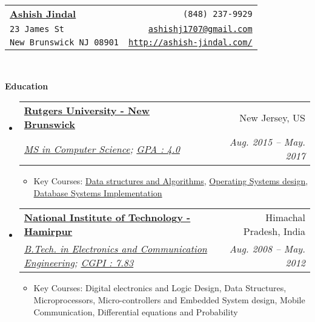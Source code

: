 \documentclass[letterpaper,11pt]{article}
\makeatletter
\newcommand{\resitem}[1]{\item #1 \vspace{-2pt}}
\newcommand{\resheading}[1]{{\large \colorbox{mygrey}{\begin{minipage}{\textwidth}{\textbf{#1 \vphantom{p\^{E}}}}\end{minipage}}}}
\newcommand{\ressubheading}[4]{
\begin{tabular*}{6.5in}{l@{\extracolsep{\fill}}r}
		\textbf{#1} & #2 \\
		\textit{#3} & \textit{#4} \\
\end{tabular*}\vspace{-6pt}}
\makeatother
\begin{document}
\newcommand{\mywebheader}{
\begin{tabular*}{7in}{l@{\extracolsep{\fill}}r}
	\textbf{\href{http://www.ashish-jindal.com/}{\LARGE Ashish Jindal}} & {\footnotesize \texttt{(848) 237-9929}}\\
	{\footnotesize \texttt{23 James St}} & {\footnotesize \texttt{\href{mailto:ashishj1707@gmail.com}{ashishj1707@gmail.com}}}\\
	 {\footnotesize \texttt{New Brunswick NJ 08901}} & {\footnotesize \texttt{\href{http://www.ashish-jindal.com/}{http://ashish-jindal.com/}}} \\
	\end{tabular*}
\\
\vspace{0.1in}}

\mywebheader

\resheading{Education}
	\begin{itemize}
		\item
			\ressubheading{\href{http://www.rutgers.edu/}{Rutgers University - New Brunswick}}{New Jersey, US}{\href{https://www.cs.rutgers.edu/}{MS in Computer Science}; \href{http://www.ashish-jindal.com/rutgers_unofficial_transcript.pdf}{GPA : 4.0}}{Aug. 2015 -- May. 2017}
				{ \footnotesize
				\begin{itemize}
					\resitem{Key Courses: \href{https://www.cs.rutgers.edu/graduate/courses/512/}{Data structures and Algorithms}, \href{https://www.cs.rutgers.edu/graduate/courses/518/}{Operating Systems design}, \href{https://www.cs.rutgers.edu/graduate/courses/539/}{Database Systems Implementation}}
				\end{itemize}
				}
	\end{itemize}
	
	\begin{itemize}
		\item
			\ressubheading{\href{http://www.nith.ac.in/}{National Institute of Technology - Hamirpur}}{Himachal Pradesh, India}{\href{http://www.nith.ac.in/ece/}{B.Tech. in Electronics and Communication Engineering}; \href{http://www.ashish-jindal.com/nith_unofficial_transcript.pdf}{CGPI : 7.83}}{Aug. 2008 -- May. 2012}
				{ \footnotesize
				\begin{itemize}
					\resitem{Key Courses: Digital electronics and Logic Design, Data Structures, Microprocessors, Micro-controllers and Embedded System design, Mobile Communication, Differential equations and Probability}
					
				\end{itemize}
				}
	\end{itemize} %
\end{document}
